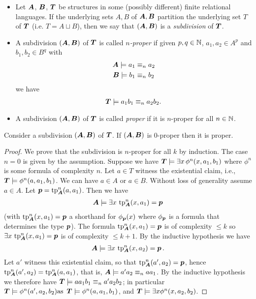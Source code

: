 \documentclass{amsart}
\DeclareMathOperator{\TT}{\boldface T}
\DeclareMathOperator{\A}{\boldface A}
\DeclareMathOperator{\B}{\boldface B}
\begin{document}
\begin{Definition}
  \begin{itemize}
  \item Let $\A$, $\B$, $\TT$ be structures in some (possibly different) finite relational languages. If the underlying sets $A, B$ of $\A, \B$ partition the underlying set $T$ of $\TT$ (i.e. $T = A \sqcup B$), then we say that $(\A, \B)$ is a \emph{subdivision} of $\TT$.
  \item A subdivision $(\A, \B)$ of $\TT$ is called \emph{$n$-proper} if given $p,q \in \mathbb{N}$,  $a_1, a_2 \in A^p$ and $b_1, b_2 \in B^q$ with
    \begin{align*}
      \A \models a_1 &\equiv_n a_2 \\
      \B \models b_1 &\equiv_n b_2
    \end{align*}
    we have
    \begin{align*}
      \TT \models a_1b_1 \equiv_n a_2b_2.
    \end{align*}
  \item A subdivision $(\A, \B)$ of $\TT$ is called \emph{proper} if it is $n$-proper for all $n \in \mathbb{N}$.
  \end{itemize}
\end{Definition}

\begin{Lemma} \label{lm_subdivision}
  Consider a subdivision $(\A, \B)$ of $\TT$. If $(\A, \B)$ is $0$-proper then it is proper.
\end{Lemma}

\begin{proof}
  We prove that the subdivision is $n$-proper for all $k$ by induction.
  The case $n = 0$ is given by the assumption.
  Suppose we have $\TT \models \exists x \, \phi^n(x, a_1, b_1)$ where $\phi^n$ is some formula of complexity $n$. Let $a \in T$ witness the existential claim, i.e., $\TT \models \phi^n(a, a_1, b_1)$. We can have $a \in A$ or $a \in B$. Without loss of generality assume $a \in A$. Let $\pp = \tp^n_{\A} (a, a_1)$. Then we have 
  \begin{align*}
    \A \models \exists x \, \tp^n_{\A}(x, a_1) = \pp
  \end{align*}
  (with $\tp^n_{\A}(x, a_1) = \pp$ a shorthand for $\phi_{\operatorname{\boldsymbol p}}(x)$ where $\phi_{\operatorname{\boldsymbol p}}$ is a formula that determines the type $\operatorname{\boldsymbol p}$).
  The formula $\tp^n_{\A}(x, a_1) = \pp$ is of complexity $\leq k$ so $\exists x \, \tp^n_{\A}(x, a_1) = \pp$ is of complexity $\leq k+1$. By the inductive hypothesis we have
  \begin{align*}
    \A \models \exists x \, \tp^n_{\A}(x, a_2) = \pp.
  \end{align*}
  Let $a'$ witness this existential claim, so that $\tp^n_{\A}(a', a_2) = \pp$, hence $\tp^n_{\A}(a', a_2) = \tp^n_{\A}(a, a_1)$, that is,
  $\A \models a'a_2 \equiv_n aa_1$. By the inductive hypothesis we therefore have
  $\TT \models aa_1b_1 \equiv_n a'a_2b_2$; in particular $\TT \models \phi^n(a', a_2, b_2)  \text {as } \TT \models \phi^n(a, a_1, b_1)$,
  and $\TT \models \exists x \phi^n(x, a_2, b_2)$.
\end{proof}
\end{document}
